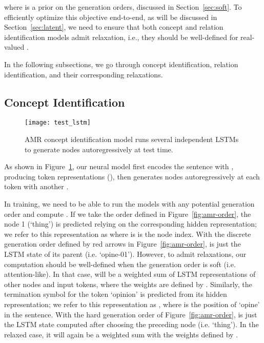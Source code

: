 \documentclass[11pt]{article}
\begin{document}
where  is a prior on the generation orders, discussed in Section~\ref{sec:soft}. 
To efficiently optimize this objective end-to-end, as will be discussed in Section~\ref{sec:latent},
we need to ensure that both concept and relation identification models admit relaxation, i.e., they should be well-defined for real-valued .  




In the following subsections, we go through concept identification, relation identification, and their corresponding relaxations. 


\subsection{Concept Identification}


\begin{figure}[t!]
\centering
\texttt{[image: test\_lstm]}
\caption{AMR concept identification model runs several independent LSTMs to generate nodes autoregressively at test time.} \label{fig:seg_lstm}
\end{figure}

 As shown in Figure~\ref{fig:seg_lstm}, our neural model first encodes the sentence with , producing token representations   (), then generates nodes autoregressively at each token with another . 

 In training, we need to be able to run the models with any potential generation order and compute . 
 If we take the order defined in Figure~\ref{fig:amr-order},
 the node 1 (`thing') is predicted 
 relying on the corresponding hidden representation;
 we refer to this representation as   where is  is the node index. With the discrete generation order  defined by red arrows in Figure~\ref{fig:amr-order},   is just the LSTM state
 of its parent (i.e. `opine-01'). However, to admit relaxations, our computation should be well-defined when the generation order  is soft (i.e. attention-like). 
 In that case,  will be a weighted sum of LSTM representations of other nodes and input tokens, where the weights are defined by .
 Similarly, the termination symbol  for the token `opinion' is predicted from its hidden representation; we refer to this representation as  , where  is the position of `opine' in the sentence. With the hard generation order of Figure~\ref{fig:amr-order},  is just the LSTM state computed after choosing the preceding node (i.e. `thing'). In the relaxed case, it will again be a weighted sum with the weights defined by .
 
\end{document}
